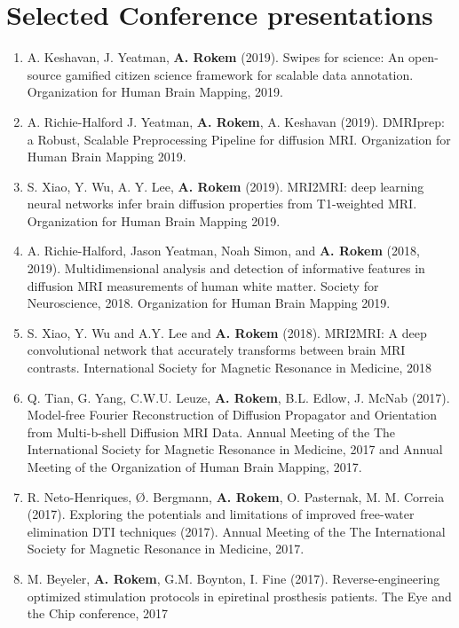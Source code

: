 \documentclass[11pt,fullpage]{article}
\begin{document}
\section*{Selected Conference presentations}
\begin{enumerate}

\item A. Keshavan, J. Yeatman, {\bf A. Rokem} (2019). Swipes for science: An
open-source gamified citizen science framework for scalable data annotation.
Organization for Human Brain Mapping, 2019.

\item A. Richie-Halford J. Yeatman, {\bf A. Rokem}, A. Keshavan (2019).
DMRIprep: a Robust, Scalable Preprocessing Pipeline for diffusion MRI.
Organization for Human Brain Mapping 2019.

\item S. Xiao, Y. Wu, A. Y. Lee, {\bf A. Rokem} (2019). MRI2MRI: deep learning
neural networks infer brain diffusion properties from T1-weighted MRI. Organization for Human Brain Mapping 2019.

\item A. Richie-Halford, Jason Yeatman, Noah Simon, and {\bf A. Rokem} (2018, 2019).
Multidimensional analysis and detection of informative features in diffusion MRI measurements
of human white matter. Society for Neuroscience, 2018. Organization for Human Brain Mapping 2019.

\item S. Xiao, Y. Wu and A.Y. Lee and {\bf A. Rokem} (2018).
MRI2MRI: A deep convolutional network that accurately transforms between brain MRI contrasts.
International Society for Magnetic Resonance in Medicine, 2018

\item Q. Tian, G. Yang, C.W.U. Leuze, {\bf A. Rokem}, B.L. Edlow, J. McNab
(2017). Model-free Fourier Reconstruction of Diffusion Propagator and
Orientation from Multi-b-shell Diffusion MRI Data. Annual Meeting of the The
International Society for Magnetic Resonance in Medicine, 2017 and Annual Meeting of the Organization of Human Brain Mapping, 2017.

\item R. Neto-Henriques, Ø. Bergmann, {\bf A. Rokem}, O. Pasternak, M. M.
Correia (2017).  Exploring the potentials and limitations of improved free-water
elimination DTI techniques (2017). Annual Meeting of the The International
Society for Magnetic Resonance in Medicine, 2017.

\item M. Beyeler, {\bf A. Rokem}, G.M. Boynton, I. Fine (2017).
Reverse-engineering optimized stimulation protocols in epiretinal prosthesis
patients. The Eye and the Chip conference, 2017


\end{enumerate}
\end{document}
